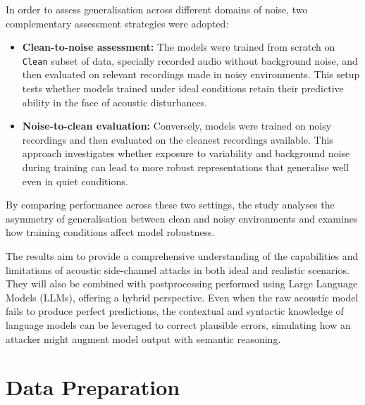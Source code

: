 \documentclass[a4paper,11pt,twoside]{report}
\theoremstyle{definition}
\begin{document}
In order to assess generalisation across different domains of noise, two complementary assessment strategies were adopted:

\begin{itemize}
    \item \textbf{Clean-to-noise assessment:} The models were trained from scratch on \texttt{Clean} subset of data, specially recorded audio without background noise, and then evaluated on relevant recordings made in noisy environments. This setup tests whether models trained under ideal conditions retain their predictive ability in the face of acoustic disturbances.

    \item \textbf{Noise-to-clean evaluation:} Conversely, models were trained on noisy recordings and then evaluated on the cleanest recordings available. This approach investigates whether exposure to variability and background noise during training can lead to more robust representations that generalise well even in quiet conditions.
\end{itemize}

By comparing performance across these two settings, the study analyses the asymmetry of generalisation between clean and noisy environments and examines how training conditions affect model robustness.

\vspace{0.7cm}

The results aim to provide a comprehensive understanding of the capabilities and limitations of acoustic side-channel attacks in both ideal and realistic scenarios. They will also be combined with postprocessing performed using Large Language Models (LLMs), offering a hybrid perspective. Even when the raw acoustic model fails to produce perfect predictions, the contextual and syntactic knowledge of language models can be leveraged to correct plausible errors, simulating how an attacker might augment model output with semantic reasoning.



\section{Data Preparation}
\end{document}
